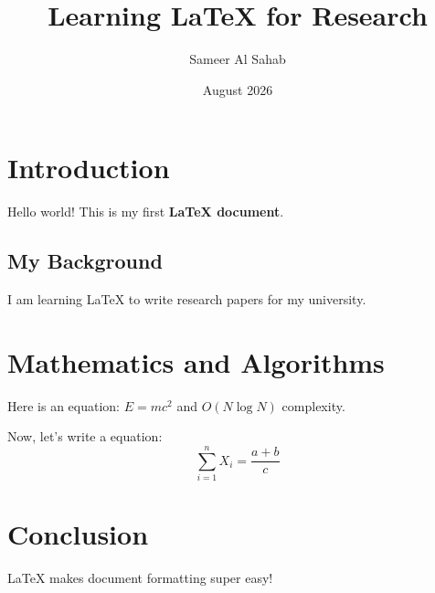 \documentclass{article}
\title{Learning LaTeX for Research}
\author{Sameer Al Sahab}
\date{August 2026}
\begin{document}
\maketitle

\section{Introduction}
Hello world! This is my first \textbf{LaTeX document}. 

\subsection{My Background}
I am learning LaTeX to write research papers for my university.

\section{Mathematics and Algorithms}
Here is an equation: $E = mc^2$ and $O(N \log N)$ complexity.

Now, let's write a equation:
\begin{equation}
\sum_{i=1}^{n} X_i = \frac{a + b}{c}
\end{equation}

\section{Conclusion}
LaTeX makes document formatting super easy!
\end{document}
